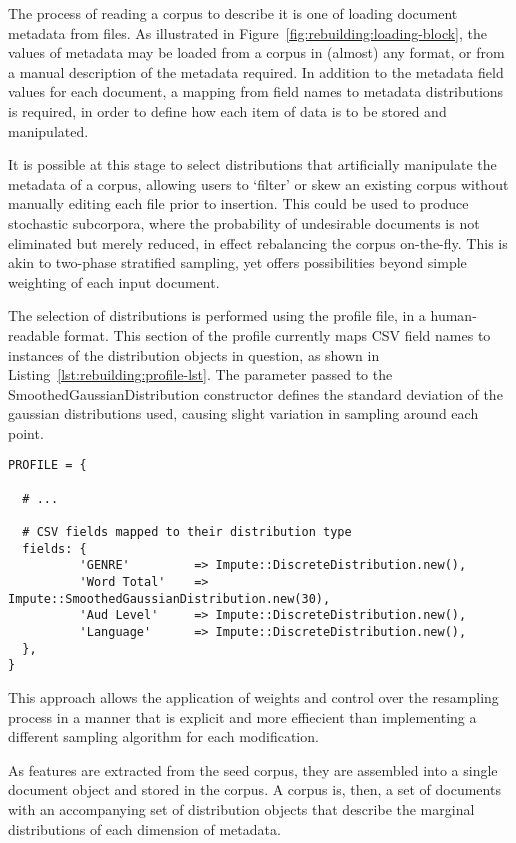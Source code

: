 The process of reading a corpus to describe it is one of loading document metadata from files.  As illustrated in Figure~\ref{fig:rebuilding:loading-block}, the values of metadata may be loaded from a corpus in (almost) any format, or from a manual description of the metadata required.  In addition to the metadata field values for each document, a mapping from field names to metadata distributions is required, in order to define how each item of data is to be stored and manipulated.

It is possible at this stage to select distributions that artificially manipulate the metadata of a corpus, allowing users to `filter' or skew an existing corpus without manually editing each file prior to insertion.  This could be used to produce stochastic subcorpora, where the probability of undesirable documents is not eliminated but merely reduced, in effect rebalancing the corpus on-the-fly.  This is akin to two-phase stratified sampling, yet offers possibilities beyond simple weighting of each input document.

The selection of distributions is performed using the profile file, in a human-readable format.  This section of the profile currently maps CSV field names to instances of the distribution objects in question, as shown in Listing~\ref{lst:rebuilding:profile-lst}.  The parameter passed to the SmoothedGaussianDistribution constructor defines the standard deviation of the gaussian distributions used, causing slight variation in sampling around each point.

\begin{lstlisting}
PROFILE = {

  # ...

  # CSV fields mapped to their distribution type
  fields: {
          'GENRE'         => Impute::DiscreteDistribution.new(),
          'Word Total'    => Impute::SmoothedGaussianDistribution.new(30),
          'Aud Level'     => Impute::DiscreteDistribution.new(),
          'Language'      => Impute::DiscreteDistribution.new(),
  },
}
\end{lstlisting}

This approach allows the application of weights and control over the resampling process in a manner that is explicit and more effiecient than implementing a different sampling algorithm for each modification.

As features are extracted from the seed corpus, they are assembled into a single document object and stored in the corpus.  A corpus is, then, a set of documents with an accompanying set of distribution objects that describe the marginal distributions of each dimension of metadata.

